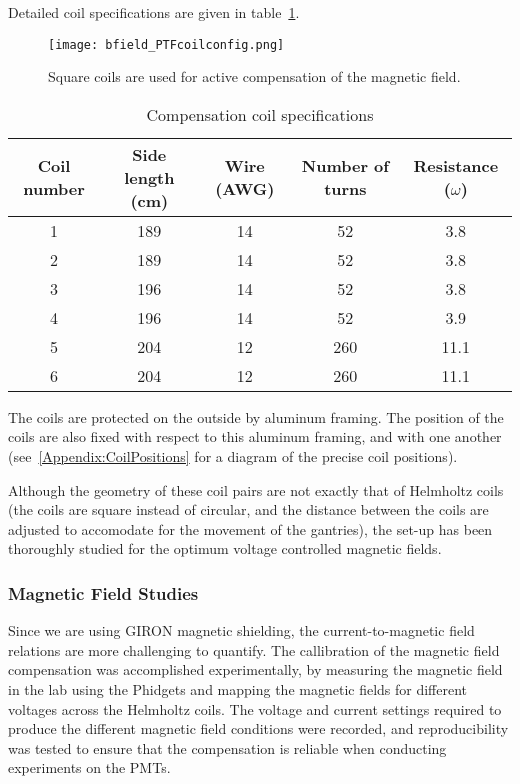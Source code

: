 Detailed coil specifications are given in table~\ref{tab:coil_specs}.
%
\begin{figure}[h]
  \begin{center}
  \texttt{[image: bfield\_PTFcoilconfig.png]}
  \caption{Square coils are used for active compensation of the magnetic field.}
  \label{fig:coils}
  \end{center}
\end{figure}
%
\begin{table}[h]
\begin{center}
  \begin{tabular}{|c||c c c c|}
    \hline
    Coil number & Side length (cm) & Wire (AWG) & Number of turns & Resistance ($\omega$)\\
    \hline\hline
    1 & 189 & 14 & 52 & 3.8 \\
    2 & 189 & 14 & 52 & 3.8 \\
    3 & 196 & 14 & 52 & 3.8 \\
    4 & 196 & 14 & 52 & 3.9 \\
    5 & 204 & 12 & 260 & 11.1 \\
    6 & 204 & 12 & 260 & 11.1 \\
  \end{tabular}
\end{center}
\caption{Compensation coil specifications}
\label{tab:coil_specs}
\end{table}
%
The coils are protected on the outside by aluminum framing. The position of the coils are also fixed with respect to this aluminum framing, and with one another (see~\ref{Appendix:CoilPositions} for a diagram of the precise coil positions).

Although the geometry of these coil pairs are not exactly that of Helmholtz coils (the coils are square instead of circular, and the distance between the coils are adjusted to accomodate for the movement of the gantries), the set-up has been thoroughly studied for the optimum voltage controlled magnetic fields.

\subsubsection{Magnetic Field Studies}

Since we are using GIRON magnetic shielding, the current-to-magnetic field relations are more challenging to quantify. The callibration of the magnetic field compensation was accomplished experimentally, by measuring the magnetic field in the lab using the Phidgets and mapping the magnetic fields for different voltages across the Helmholtz coils. The voltage and current settings required to produce the different magnetic field conditions were recorded, and reproducibility was tested to ensure that the compensation is reliable when conducting experiments on the PMTs.

